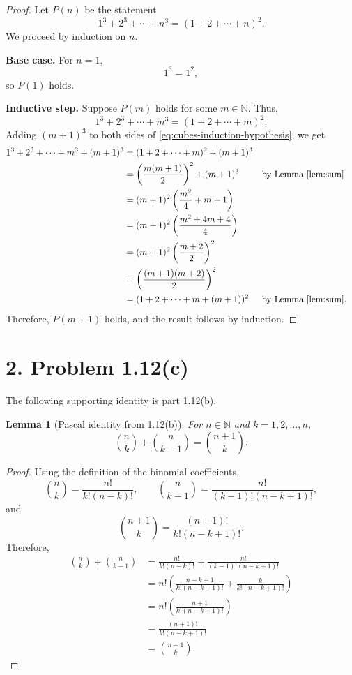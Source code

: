 \documentclass[11pt]{article}
\newtheorem{lemma}{Lemma}
\begin{document}
\begin{proof}
Let \(P(n)\) be the statement
\[
1^3+2^3+\cdots+n^3=(1+2+\cdots+n)^2.
\]
We proceed by induction on \(n\).

\textbf{Base case.} For \(n=1\),
\[
1^3=1^2,
\]
so \(P(1)\) holds.

\textbf{Inductive step.} Suppose \(P(m)\) holds for some \(m\in\mathbb{N}\).
Thus,
\begin{equation}\label{eq:cubes-induction-hypothesis}
1^3+2^3+\cdots+m^3=(1+2+\cdots+m)^2.
\end{equation}
Adding \((m+1)^3\) to both sides of \eqref{eq:cubes-induction-hypothesis}, we get
\begin{align*}
1^3+2^3+\cdots+m^3+(m+1)^3
&=(1+2+\cdots+m)^2+(m+1)^3\\
&=\left(\frac{m(m+1)}{2}\right)^2+(m+1)^3
    &&\text{by Lemma~\ref{lem:sum}}\\
&=(m+1)^2\left(\frac{m^2}{4}+m+1\right)\\
&=(m+1)^2\left(\frac{m^2+4m+4}{4}\right)\\
&=(m+1)^2\left(\frac{m+2}{2}\right)^2\\
&=\left(\frac{(m+1)(m+2)}{2}\right)^2\\
&=(1+2+\cdots+m+(m+1))^2
    &&\text{by Lemma~\ref{lem:sum}}.
\end{align*}
Therefore, \(P(m+1)\) holds, and the result follows by induction.
\end{proof}

\section*{2. Problem 1.12(c)}

The following supporting identity is part 1.12(b).

\begin{lemma}[Pascal identity from 1.12(b)]
For \(n \in \mathbb{N}\) and \(k=1,2,\ldots,n\),
\[
\binom{n}{k}+\binom{n}{k-1}=\binom{n+1}{k}.
\]
\end{lemma}

\begin{proof}
Using the definition of the binomial coefficients,
\[
\binom{n}{k}=\frac{n!}{k!(n-k)!},
\qquad
\binom{n}{k-1}=\frac{n!}{(k-1)!(n-k+1)!},
\]
and
\[
\binom{n+1}{k}=\frac{(n+1)!}{k!(n-k+1)!}.
\]
Therefore,
\begin{align*}
\binom{n}{k}+\binom{n}{k-1}
&=\frac{n!}{k!(n-k)!}
  +\frac{n!}{(k-1)!(n-k+1)!}\\[4pt]
&=n!\left(
  \frac{n-k+1}{k!(n-k+1)!}
  +\frac{k}{k!(n-k+1)!}
  \right)\\[4pt]
&=n!\left(\frac{n+1}{k!(n-k+1)!}\right)\\[4pt]
&=\frac{(n+1)!}{k!(n-k+1)!}\\[4pt]
&=\binom{n+1}{k}.
\end{align*}
\end{proof}
\end{document}
